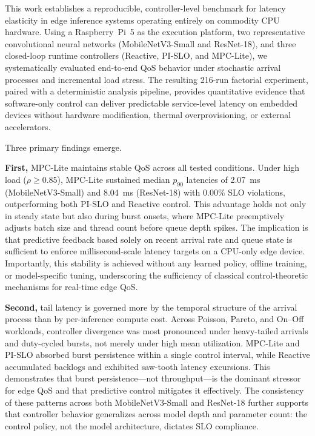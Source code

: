 \documentclass[acmsmall]{acmart}
\begin{document}
This work establishes a reproducible, controller-level benchmark for latency elasticity in edge inference systems operating entirely on commodity CPU hardware.  
Using a Raspberry~Pi~5 as the execution platform, two representative convolutional neural networks (MobileNetV3-Small and ResNet-18), and three closed-loop runtime controllers (Reactive, PI-SLO, and MPC-Lite), we systematically evaluated end-to-end QoS behavior under stochastic arrival processes and incremental load stress.  
The resulting 216-run factorial experiment, paired with a deterministic analysis pipeline, provides quantitative evidence that software-only control can deliver predictable service-level latency on embedded devices without hardware modification, thermal overprovisioning, or external accelerators.

Three primary findings emerge.

\textbf{First,} MPC-Lite maintains stable QoS across all tested conditions.  
Under high load ($\rho \ge 0.85$), MPC-Lite sustained median $p_{90}$ latencies of 2.07~ms (MobileNetV3-Small) and 8.04~ms (ResNet-18) with 0.00\% SLO violations, outperforming both PI-SLO and Reactive control.  
This advantage holds not only in steady state but also during burst onsets, where MPC-Lite preemptively adjusts batch size and thread count before queue depth spikes.  
The implication is that predictive feedback based solely on recent arrival rate and queue state is sufficient to enforce millisecond-scale latency targets on a CPU-only edge device.  
Importantly, this stability is achieved without any learned policy, offline training, or model-specific tuning, underscoring the sufficiency of classical control-theoretic mechanisms for real-time edge QoS.

\textbf{Second,} tail latency is governed more by the temporal structure of the arrival process than by per-inference compute cost.  
Across Poisson, Pareto, and On--Off workloads, controller divergence was most pronounced under heavy-tailed arrivals and duty-cycled bursts, not merely under high mean utilization.  
MPC-Lite and PI-SLO absorbed burst persistence within a single control interval, while Reactive accumulated backlogs and exhibited saw-tooth latency excursions.  
This demonstrates that burst persistence—not throughput—is the dominant stressor for edge QoS and that predictive control mitigates it effectively.  
The consistency of these patterns across both MobileNetV3-Small and ResNet-18 further supports that controller behavior generalizes across model depth and parameter count: the control policy, not the model architecture, dictates SLO compliance.
\end{document}
